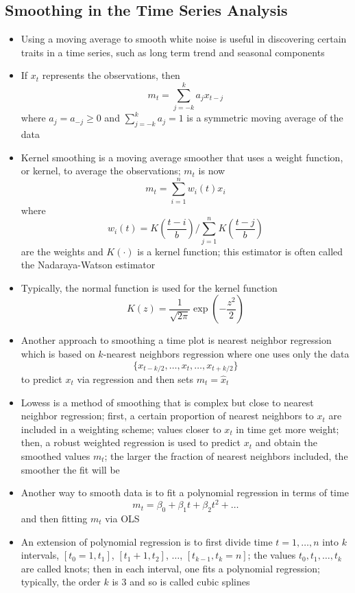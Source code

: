 \documentclass[12pt]{article}
\begin{document}
\subsection{Smoothing in the Time Series Analysis}
\begin{itemize}
\item Using a moving average to smooth white noise is useful in discovering certain traits in a time series, such as long term trend and seasonal components 
\item If $x_t$ represents the observations, then $$ m_t = \sum_{j=-k}^k a_jx_{t-j} $$ where $a_j = a_{-j} \geq 0$ and $\sum_{j=-k}^k a_j = 1$ is a symmetric moving average of the data 
\item Kernel smoothing is a moving average smoother that uses a weight function, or kernel, to average the observations; $m_t$ is now $$ m_t = \sum_{i=1}^n w_i(t)x_i $$ where $$ w_i(t) = K\left( \frac{t-i}{b} \right) / \sum_{j=1}^n K \left( \frac{t-j}{b} \right) $$ are the weights and $K(\cdot)$ is a kernel function; this estimator is often called the Nadaraya-Watson estimator
\item Typically, the normal function is used for the kernel function $$ K(z) = \frac{1}{\sqrt{2\pi}}\exp\left( -\frac{z^2}{2} \right) $$ 
\item Another approach to smoothing a time plot is nearest neighbor regression which is based on $k$-nearest neighbors regression where one uses only the data $$\{x_{t-k/2},\dots,x_t,\dots,x_{t+k/2}\}$$ to predict $x_t$ via regression and then sets $m_t = \hat{x}_t$ 
\item Lowess is a method of smoothing that is complex but close to nearest neighbor regression; first, a certain proportion of nearest neighbors to $x_t$ are included in a weighting scheme; values closer to $x_t$ in time get more weight; then, a robust weighted regression is used to predict $x_t$ and obtain the smoothed values $m_t$; the larger the fraction of nearest neighbors included, the smoother the fit will be 
\item Another way to smooth data is to fit a polynomial regression in terms of time $$ m_t = \beta_0 + \beta_1t + \beta_2t^2 + \dots $$ and then fitting $m_t$ via OLS
\item An extension of polynomial regression is to first divide time $t = 1,\dots,n$ into $k$ intervals, $[t_0 = 1,t_1]$, $[t_1+1,t_2]$, $\dots$, $[t_{k-1}, t_k = n]$; the values $t_0,t_1,\dots,t_k$ are called knots; then in each interval, one fits a polynomial regression; typically, the order $k$ is $3$ and so is called cubic splines

\end{itemize}
\end{document}
